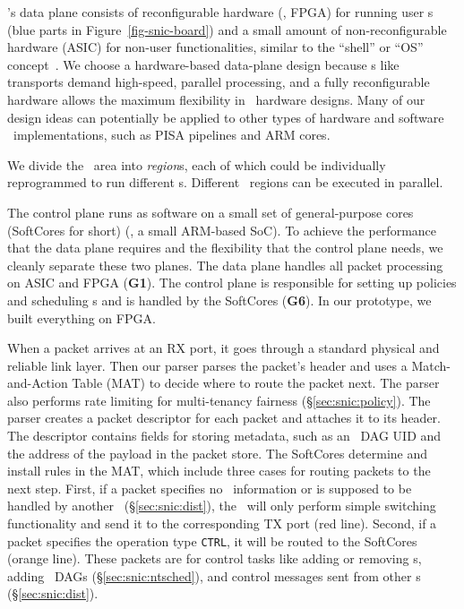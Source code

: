 \snic's data plane consists of reconfigurable hardware (\eg, FPGA) for running user \nt{}s (blue parts in Figure~\ref{fig-snic-board})
and a small amount of non-reconfigurable hardware (ASIC) for non-user functionalities, similar to the ``shell'' or ``OS'' concept~\cite{Catapult-v2,Amazon-F1,amorphos-osdi18,coyote-osdi20}.
We choose a hardware-based data-plane design because \nt{}s like transports demand high-speed, parallel processing, and a fully reconfigurable hardware allows the maximum flexibility in \nt\ hardware designs.
Many of our design ideas can potentially be applied to other types of hardware and software \nt\ implementations, such as PISA pipelines and ARM cores.

We divide the \nt\ area into {\em region}s, each of which could be individually reprogrammed to run different \nt{}s.
Different \nt\ regions can be executed in parallel.

The control plane runs as software on a small set of general-purpose cores (SoftCores for short) (\eg, a small ARM-based SoC). 
To achieve the performance that the data plane requires and the flexibility that the control plane needs, we cleanly separate these two planes.
The data plane handles all packet processing on ASIC and FPGA (\textbf{G1}).
The control plane is responsible for setting up policies and scheduling \nt{}s and is handled by the SoftCores (\textbf{G6}).
In our prototype, we built everything on FPGA. 


When a packet arrives at an RX port, it goes through a standard physical and reliable link layer.
Then our parser parses the packet's header and uses a Match-and-Action Table (MAT) to decide where to route the packet next.
The parser also performs rate limiting for multi-tenancy fairness (\S\ref{sec:snic:policy}).
The parser creates a packet descriptor for each packet and attaches it to its header. The descriptor contains fields for storing metadata, such as an \nt\ DAG UID and the address of the payload in the packet store. 
The SoftCores determine and install rules in the MAT, which include three cases for routing packets to the next step.
First, if a packet specifies no \nt\ information or is supposed to be handled by another \snic\ (\S\ref{sec:snic:dist}), the \snic\ will only perform simple switching functionality and send it to the corresponding TX port (red line).
Second, if a packet specifies the operation type \texttt{CTRL}, it will be routed to the SoftCores (orange line). These packets are for control tasks like adding or removing \nt{}s, adding \nt\ DAGs (\S\ref{sec:snic:ntsched}), and control messages sent from other \snic{}s (\S\ref{sec:snic:dist}).

